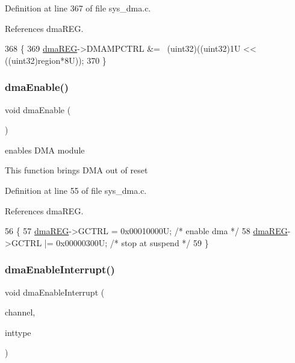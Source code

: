 Definition at line 367 of file sys\+\_\+dma.\+c.



References dma\+R\+EG.


\begin{DoxyCode}
368 \{
369     \mbox{\hyperlink{reg__dma_8h_aae27308852f460efc99fcbf6eb47ea86}{dmaREG}}->DMAMPCTRL &= ~(uint32)((uint32)1U << ((uint32)region*8U));
370 \}
\end{DoxyCode}
\mbox{\label{group__DMA_ga075cb5440673bd8e8a85d24c1c724a84}} 
\subsubsection{\texorpdfstring{dma\+Enable()}{dmaEnable()}}
{\footnotesize\ttfamily void dma\+Enable (\begin{DoxyParamCaption}\item[{void}]{ }\end{DoxyParamCaption})}



enables D\+MA module 

This function brings D\+MA out of reset 

Definition at line 55 of file sys\+\_\+dma.\+c.



References dma\+R\+EG.


\begin{DoxyCode}
56 \{
57   \mbox{\hyperlink{reg__dma_8h_aae27308852f460efc99fcbf6eb47ea86}{dmaREG}}->GCTRL  = 0x00010000U; \textcolor{comment}{/* enable dma      */}
58   \mbox{\hyperlink{reg__dma_8h_aae27308852f460efc99fcbf6eb47ea86}{dmaREG}}->GCTRL |= 0x00000300U; \textcolor{comment}{/* stop at suspend */}
59 \}
\end{DoxyCode}
\mbox{\label{group__DMA_ga55e0af7aeb95a528b05aec15001a6db6}} 
\subsubsection{\texorpdfstring{dma\+Enable\+Interrupt()}{dmaEnableInterrupt()}}
{\footnotesize\ttfamily void dma\+Enable\+Interrupt (\begin{DoxyParamCaption}\item[{uint32}]{channel,  }\item[{dma\+Interrupt\+\_\+t}]{inttype }\end{DoxyParamCaption})}




